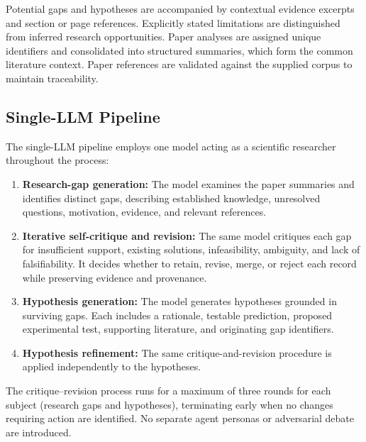 \documentclass[sigconf,review,anonymous=false]{acmart}
\begin{document}
Potential gaps and hypotheses are accompanied by contextual evidence excerpts and section or page references. Explicitly stated limitations are distinguished from inferred research opportunities. Paper analyses are assigned unique identifiers and consolidated into structured summaries, which form the common literature context. Paper references are validated against the supplied corpus to maintain traceability.

\subsection{Single-LLM Pipeline}
The single-LLM pipeline employs one model acting as a scientific researcher throughout the process:
\begin{enumerate}[leftmargin=*]
  \item \textbf{Research-gap generation:} The model examines the paper summaries and identifies distinct gaps, describing established knowledge, unresolved questions, motivation, evidence, and relevant references.
  \item \textbf{Iterative self-critique and revision:} The same model critiques each gap for insufficient support, existing solutions, infeasibility, ambiguity, and lack of falsifiability. It decides whether to retain, revise, merge, or reject each record while preserving evidence and provenance.
  \item \textbf{Hypothesis generation:} The model generates hypotheses grounded in surviving gaps. Each includes a rationale, testable prediction, proposed experimental test, supporting literature, and originating gap identifiers.
  \item \textbf{Hypothesis refinement:} The same critique-and-revision procedure is applied independently to the hypotheses.
\end{enumerate}
The critique--revision process runs for a maximum of three rounds for each subject (research gaps and hypotheses), terminating early when no changes requiring action are identified. No separate agent personas or adversarial debate are introduced.
\end{document}
